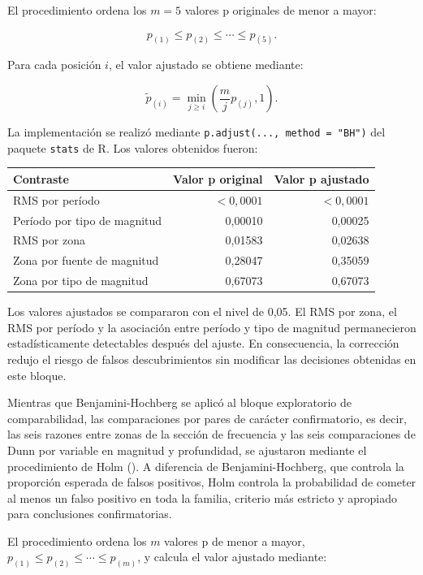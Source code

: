 \documentclass[
  spanish,
  letterpaper,
  DIV=11,
  numbers=noendperiod]{scrartcl}
\newcounter{none} %
\begin{document}
El procedimiento ordena los \(m=5\) valores p originales de menor a
mayor:

\[
p_{(1)}\leq p_{(2)}\leq\cdots\leq p_{(5)}.
\]

Para cada posición \(i\), el valor ajustado se obtiene mediante:

\[
\widetilde p_{(i)}
=
\min_{j\geq i}
\left(
\frac{m}{j}p_{(j)},1
\right).
\]

La implementación se realizó mediante
\texttt{p.adjust(...,\ method\ =\ "BH")} del paquete \texttt{stats} de
R. Los valores obtenidos fueron:

{\def\LTcaptype{none} %
\begin{longtable}[]{@{}lrr@{}}
\toprule\noalign{}
Contraste & Valor p original & Valor p ajustado \\
\midrule\noalign{}
\endhead
\bottomrule\noalign{}
\endlastfoot
RMS por período & \(<0{,}0001\) & \(<0{,}0001\) \\
Período por tipo de magnitud & 0,00010 & 0,00025 \\
RMS por zona & 0,01583 & 0,02638 \\
Zona por fuente de magnitud & 0,28047 & 0,35059 \\
Zona por tipo de magnitud & 0,67073 & 0,67073 \\
\end{longtable}
}

Los valores ajustados se compararon con el nivel de 0,05. El RMS por
zona, el RMS por período y la asociación entre período y tipo de
magnitud permanecieron estadísticamente detectables después del ajuste.
En consecuencia, la corrección redujo el riesgo de falsos
descubrimientos sin modificar las decisiones obtenidas en este bloque.

Mientras que Benjamini-Hochberg se aplicó al bloque exploratorio de
comparabilidad, las comparaciones por pares de carácter confirmatorio,
es decir, las seis razones entre zonas de la sección de frecuencia y las
seis comparaciones de Dunn por variable en magnitud y profundidad, se
ajustaron mediante el procedimiento de Holm
(). A diferencia de
Benjamini-Hochberg, que controla la proporción esperada de falsos
positivos, Holm controla la probabilidad de cometer al menos un falso
positivo en toda la familia, criterio más estricto y apropiado para
conclusiones confirmatorias.

El procedimiento ordena los \(m\) valores p de menor a mayor,
\(p_{(1)}\leq p_{(2)}\leq\cdots\leq p_{(m)}\), y calcula el valor
ajustado mediante:
\end{document}
